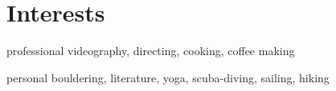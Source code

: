 \documentclass[]{friggeri-cv} %
\begin{document}

\section{Interests}

\begin{entrylist}
	\smallentry
	{professional}
	{videography, directing, cooking, coffee making}

	\smallentry
	{personal}
	{bouldering, literature, yoga, scuba-diving, sailing, hiking}
	
\end{entrylist}










\end{document}
